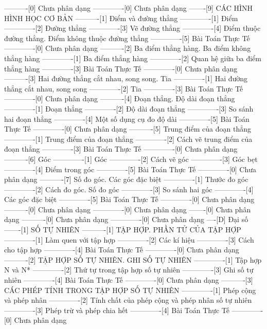 ----------[0] Chưa phân dạng
-------------[0] Chưa phân dạng
-------[9] CÁC HÌNH HÌNH HỌC CƠ BẢN
----------[1] Điểm và đường thẳng
-------------[1] Điểm
-------------[2] Đường thẳng
-------------[3] Vẽ đường thẳng
-------------[4] Điểm thuộc đường thẳng. Điểm không thuộc đường thẳng
-------------[5] Bài Toán Thực Tế
-------------[0] Chưa phân dạng
----------[2] Ba điểm thẳng hàng. Ba điểm không thẳng hàng
-------------[1] Ba điểm thẳng hàng
-------------[2] Quan hệ giữa ba điểm thẳng hàng
-------------[3] Bài Toán Thực Tế
-------------[0] Chưa phân dạng
----------[3] Hai đường thẳng cắt nhau, song song. Tia
-------------[1] Hai đường thẳng cắt nhau, song song
-------------[2] Tia
-------------[3] Bài Toán Thực Tế
-------------[0] Chưa phân dạng
----------[4] Đoạn thẳng. Độ dài đoạn thẳng
-------------[1] Đoạn thẳng
-------------[2] Độ dài đoạn thẳng
-------------[3] So sánh hai đoạn thẳng
-------------[4] Một số dụng cụ đo độ dài
-------------[5] Bài Toán Thực Tế
-------------[0] Chưa phân dạng
----------[5] Trung điểm của đoạn thẳng
-------------[1] Trung điểm của đoạn thẳng
-------------[2] Cách vẽ trung điểm của đoạn thẳng
-------------[3] Bài Toán Thực Tế
-------------[0] Chưa phân dạng
----------[6] Góc
-------------[1] Góc
-------------[2] Cách vẽ góc
-------------[3] Góc bẹt
-------------[4] Điểm trong góc
-------------[5] Bài Toán Thực Tế
-------------[0] Chưa phân dạng
----------[7] Số đo góc. Các góc đặc biệt
-------------[1] Thước đo góc
-------------[2] Cách đo góc. Số đo góc
-------------[3] So sánh hai góc
-------------[4] Các góc đặc biệt
-------------[5] Bài Toán Thực Tế
-------------[0] Chưa phân dạng
----------[0] Chưa phân dạng
-------------[0] Chưa phân dạng
-------[0] Chưa phân dạng
----------[0] Chưa phân dạng
-------------[0] Chưa phân dạng
----[D] Đại số
-------[1] SỐ TỰ NHIÊN
----------[1] TẬP HỢP. PHẦN TỬ CỦA TẬP HỢP
-------------[1] Làm quen với tập hợp
-------------[2] Các kí hiệu
-------------[3] Cách cho tập hợp
-------------[4] Bài Toán Thực Tế
-------------[0] Chưa phân dạng
----------[2] TẬP HỢP SỐ TỰ NHIÊN. GHI SỐ TỰ NHIÊN
-------------[1] Tập hợp N và N*
-------------[2] Thứ tự trong tập hợp số tự nhiên
-------------[3] Ghi số tự nhiên
-------------[4] Bài Toán Thực Tế
-------------[0] Chưa phân dạng
----------[3] CÁC PHÉP TÍNH TRONG TẬP HỢP SỐ TỰ NHIÊN
-------------[1] Phép cộng và phép nhân
-------------[2] Tính chất của phép cộng và phép nhân số tự nhiên
-------------[3] Phép trừ và phép chia hết
-------------[4] Bài Toán Thực Tế
-------------[0] Chưa phân dạng
